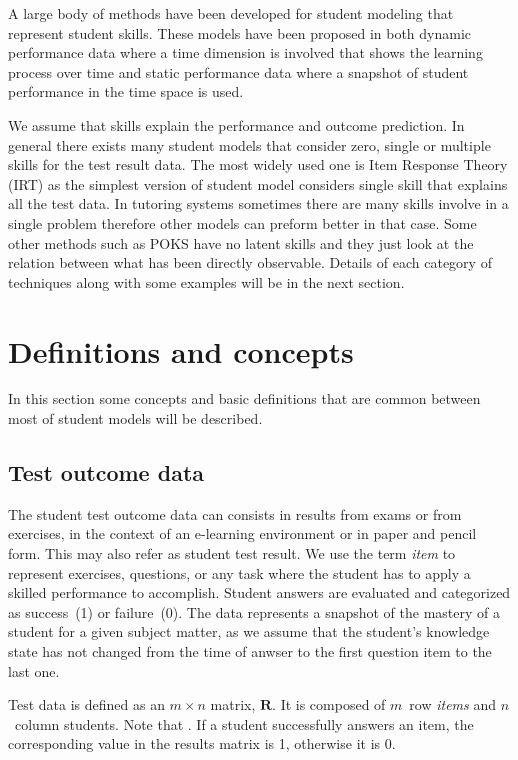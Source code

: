 \label{sec:RevLitt}

A large body of methods have been developed for student modeling that represent student skills. These models have been proposed in both dynamic performance data where a time dimension is involved that shows the learning process over time and static performance data where a snapshot of student performance in the time space is used. 

We assume that skills explain the performance and outcome prediction. In general there exists many student models that consider zero, single or multiple skills for the test result data. The most widely used one is Item Response Theory (IRT)  as the simplest version of student model considers single skill that explains all the test data. In tutoring systems sometimes there are many skills involve in a single problem therefore other models can preform better in that case. Some other methods such as POKS have no latent skills and they just look at the relation between what has been directly observable. Details of each category of techniques along with some examples will be in the next section.


\section{Definitions and concepts}

In this section some concepts and basic definitions that are common between most of student models will be described. 
 
\subsection{Test outcome data}

The student test outcome data can consists in results from exams or from exercises, in the context of an e-learning environment or in paper and pencil form. This may also refer as student test result. We use the term \textit{item} to represent exercises, questions, or any task where the student has to apply a skilled performance to accomplish.  Student answers are evaluated and categorized as success~(1) or failure~(0).  The data represents a snapshot of the mastery of a student for a given subject matter, as we assume that the student's knowledge state has not changed from the time of anwser to the first question item to the last one.

Test data is defined as an $m \times n$ matrix, $\mathbf{R}$. It is composed of $m$~row \textit{items} and $n$~column students. Note that .  If a student successfully answers an item, the corresponding value in the results matrix is 1, otherwise it is 0.

